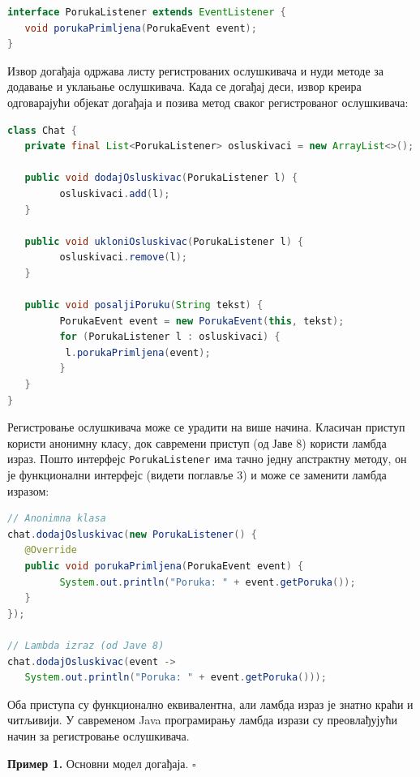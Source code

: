 \begin{lstlisting}[language=Java]
interface PorukaListener extends EventListener {
   void porukaPrimljena(PorukaEvent event);
}
\end{lstlisting}


Извор догађаја одржава листу регистрованих ослушкивача и нуди методе за додавање и уклањање ослушкивача. Када се догађај деси, извор креира одговарајући објекат догађаја и позива метод сваког регистрованог ослушкивача:


\begin{lstlisting}[language=Java]
class Chat {
   private final List<PorukaListener> osluskivaci = new ArrayList<>();
 
   public void dodajOsluskivac(PorukaListener l) {
         osluskivaci.add(l);
   }
 
   public void ukloniOsluskivac(PorukaListener l) {
         osluskivaci.remove(l);
   }
 
   public void posaljiPoruku(String tekst) {
         PorukaEvent event = new PorukaEvent(this, tekst);
         for (PorukaListener l : osluskivaci) {
          l.porukaPrimljena(event);
         }
   }
}
\end{lstlisting}


Регистровање ослушкивача може се урадити на више начина. Класичан приступ користи анонимну класу, док савремени приступ (од Јаве 8) користи ламбда израз. Пошто интерфејс \texttt{PorukaListener} има тачно једну апстрактну методу, он је функционални интерфејс (видети поглавље 3) и може се заменити ламбда изразом:


\begin{lstlisting}[language=Java]
// Anonimna klasa
chat.dodajOsluskivac(new PorukaListener() {
   @Override
   public void porukaPrimljena(PorukaEvent event) {
         System.out.println("Poruka: " + event.getPoruka());
   }
});
 
// Lambda izraz (od Jave 8)
chat.dodajOsluskivac(event ->
   System.out.println("Poruka: " + event.getPoruka()));
\end{lstlisting}


Оба приступа су функционално еквивалентна, али ламбда израз је знатно краћи и читљивији. У савременом Java програмирању ламбда изрази су преовлађујући начин за регистровање ослушкивача.


\bigskip

\noindent \textbf{Пример 1.} Основни модел догађаја. $\square$

